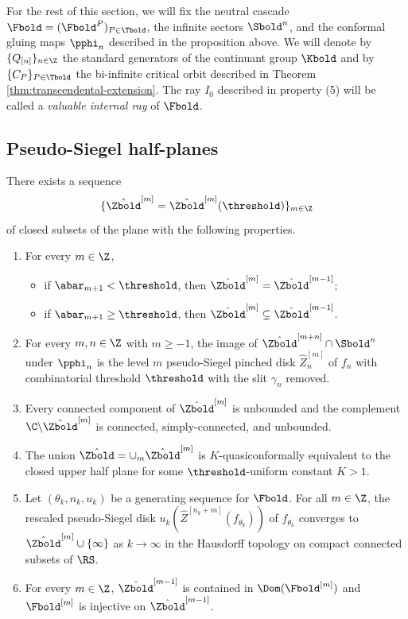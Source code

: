 \documentclass{amsart}
\begin{document}
For the rest of this section, we will fix the neutral cascade $\Fbold = (\Fbold^P)_{P \in \Tbold}$, the infinite sectors $\Sbold^n$, and the conformal gluing maps $\pphi_n$ described in the proposition above.
We will denote by $\{Q_{[n]}\}_{n\in \Z}$ the standard generators of the continuant group $\Kbold$ and by $\{C_P\}_{P \in \Tbold}$ the bi-infinite critical orbit described in Theorem \ref{thm:transcendental-extension}.
The ray $I_0$ described in property (5) will be called a \emph{valuable internal ray} of $\Fbold$.

\subsection{Pseudo-Siegel half-planes}
\label{ss:wZbounds for halfplanes}

\begin{proposition}
\label{prop:trans-pseudo-siegel}
    There exists a sequence 
    \[
    \{\hat{\Zbold}^{[m]} = \hat{\Zbold}^{[m]}(\threshold)\}_{m\in\Z}
    \]
    of closed subsets of the plane with the following properties.
    \begin{enumerate}
        \item For every $m \in \Z$, 
        \begin{itemize}
            \item if $\abar_{m+1}< \threshold$, then $\hat{\Zbold}^{[m]} = \hat{\Zbold}^{[m-1]}$;
            \item if $\abar_{m+1} \geq\threshold$, then $\hat{\Zbold}^{[m]} \subsetneq \hat{\Zbold}^{[m-1]}$.
        \end{itemize}
        \item For every $m,n \in \Z$ with $m \geq -1$, the image of $\hat{\Zbold}^{[m+n]} \cap \Sbold^n$ under $\pphi_n$ is the level $m$ pseudo-Siegel pinched disk $\hat{Z}_n^{[m]}$ of $f_n$ with combinatorial threshold $\threshold$ with the slit $\gamma_n$ removed.
        \item Every connected component of $\hat{\Zbold}^{[m]}$ is unbounded and the complement $\C \backslash \hat{\Zbold}^{[m]}$ is connected, simply-connected, and unbounded.
        \item The union $\hat{\Zbold} = \cup_m \hat{\Zbold}^{[m]}$ is $K$-quasiconformally equivalent to the closed upper half plane for some $\threshold$-uniform constant $K>1$.
        \item Let $(\theta_k, n_k, u_k)$ be a generating sequence for $\Fbold$.
        For all $m \in \Z$, the rescaled pseudo-Siegel disk $u_k(\hat{Z}^{[n_k+m]}(f_{\theta_k}))$ of $f_{\theta_k}$ converges to $\hat{\Zbold}^{[m]} \cup \{\infty\}$ as $k \to \infty$ in the Hausdorff topology on compact connected subsets of $\RS$.
        \item For every $m \in \Z$, $\hat{\Zbold}^{[m-1]}$ is contained in $\Dom(\Fbold^{[m]})$ and $\Fbold^{[m]}$ is injective on $\hat{\Zbold}^{[m-1]}$.
    \end{enumerate}
\end{proposition}
\end{document}
